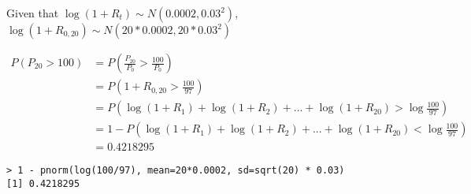\documentclass[11pt]{scrartcl}
\begin{document}
Given that $\log{(1+R_t)} \sim N(0.0002, 0.03^2)$, $\log{(1+R_{0,20})} \sim N(20 * 0.0002, 20 * 0.03^2)$

\begin{align*}
P(P_{20} > 100) &= P\left(\frac{P_{20}}{P_0} > \frac{100}{P_0} \right) \\
&= P \left( 1 + R_{0,20} > \frac{100}{97} \right) \\
&= P\left( \log{(1+R_1)} + \log{(1+R_2)} + ... + \log{(1+R_{20})} > \log{\frac{100}{97}} \right) \\
&= 1 - P\left( \log{(1+R_1)} + \log{(1+R_2)} + ... + \log{(1+R_{20})} < \log{\frac{100}{97}} \right) \\
&= 0.4218295
\end{align*}

\begin{lstlisting}
> 1 - pnorm(log(100/97), mean=20*0.0002, sd=sqrt(20) * 0.03)
[1] 0.4218295
\end{lstlisting}
\end{document}
